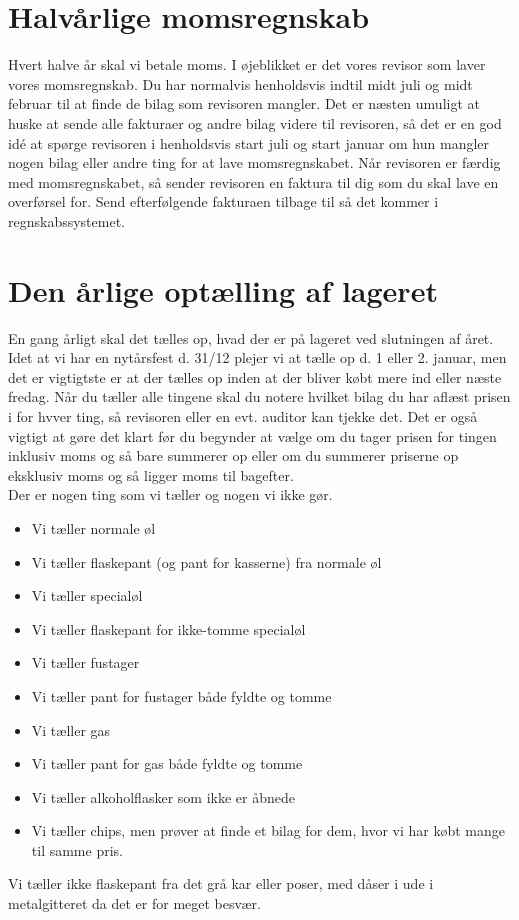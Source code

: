 \section{Halvårlige momsregnskab}
Hvert halve år skal vi betale moms. I øjeblikket er det vores revisor som laver vores momsregnskab. Du har normalvis henholdsvis indtil midt juli og midt februar til at finde de bilag som revisoren mangler. Det er næsten umuligt at huske at sende alle fakturaer og andre bilag videre til revisoren, så det er en god idé at spørge revisoren i henholdsvis start juli og start januar om hun mangler nogen bilag eller andre ting for at lave momsregnskabet. Når revisoren er færdig med momsregnskabet, så sender revisoren en faktura til dig som du skal lave en overførsel for. Send efterfølgende fakturaen tilbage til  så det kommer i regnskabssystemet.

\section{Den årlige optælling af lageret}
En gang årligt skal det tælles op, hvad der er på lageret ved slutningen af året. Idet at vi har en nytårsfest d. 31/12 plejer vi at tælle op d. 1 eller 2. januar, men det er vigtigtste er at der tælles op inden at der bliver købt mere ind eller næste fredag. Når du tæller alle tingene skal du notere hvilket bilag du har aflæst prisen i for hvver ting, så revisoren eller en evt. auditor kan tjekke det. Det er også vigtigt at gøre det klart før du begynder at vælge om du tager prisen for tingen inklusiv moms og så bare summerer op eller om du summerer priserne op eksklusiv moms og så ligger moms til bagefter.\\
Der er nogen ting som vi tæller og nogen vi ikke gør.
\begin{itemize}
    \item Vi tæller normale øl
    \item Vi tæller flaskepant (og pant for kasserne) fra normale øl
    \item Vi tæller specialøl
    \item Vi tæller flaskepant for ikke-tomme specialøl
    \item Vi tæller fustager
    \item Vi tæller pant for fustager både fyldte og tomme
    \item Vi tæller gas
    \item Vi tæller pant for gas både fyldte og tomme
    \item Vi tæller alkoholflasker som ikke er åbnede
    \item Vi tæller chips, men prøver at finde et bilag for dem, hvor vi har købt mange til samme pris.
\end{itemize}
Vi tæller ikke flaskepant fra det grå kar eller poser, med dåser i ude i metalgitteret da det er for meget besvær.

